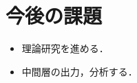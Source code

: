 \documentclass[a4paper,10pt]{jsarticle}
\begin{document}


\section{今後の課題}
\begin{itemize}
 \item 理論研究を進める．
 \item 中間層の出力，分析する．
\end{itemize}
\end{document}
